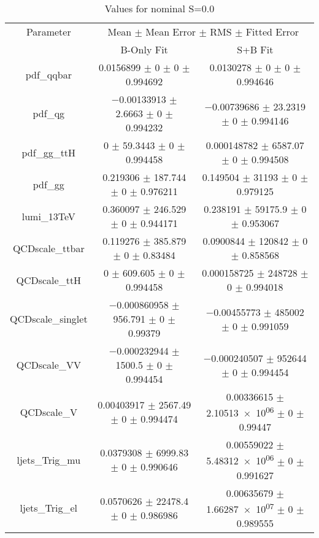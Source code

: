 \begin{table}
\centering
\caption{Values for nominal S=0.0}
\begin{tabular}{ccc}
\toprule
Parameter & \multicolumn{2}{c}{Mean $\pm$ Mean Error $\pm$ RMS $\pm$ Fitted Error}\\
 & B-Only Fit & S+B Fit\\
\midrule
pdf\_qqbar & \num{0.0156899} $\pm$ \num{0} $\pm$ \num{0} $\pm$ \num{0.994692} & \num{0.0130278} $\pm$ \num{0} $\pm$ \num{0} $\pm$ \num{0.994646}\\
pdf\_qg & \num{-0.00133913} $\pm$ \num{2.6663} $\pm$ \num{0} $\pm$ \num{0.994232} & \num{-0.00739686} $\pm$ \num{23.2319} $\pm$ \num{0} $\pm$ \num{0.994146}\\
pdf\_gg\_ttH & \num{0} $\pm$ \num{59.3443} $\pm$ \num{0} $\pm$ \num{0.994458} & \num{0.000148782} $\pm$ \num{6587.07} $\pm$ \num{0} $\pm$ \num{0.994508}\\
pdf\_gg & \num{0.219306} $\pm$ \num{187.744} $\pm$ \num{0} $\pm$ \num{0.976211} & \num{0.149504} $\pm$ \num{31193} $\pm$ \num{0} $\pm$ \num{0.979125}\\
lumi\_13TeV & \num{0.360097} $\pm$ \num{246.529} $\pm$ \num{0} $\pm$ \num{0.944171} & \num{0.238191} $\pm$ \num{59175.9} $\pm$ \num{0} $\pm$ \num{0.953067}\\
QCDscale\_ttbar & \num{0.119276} $\pm$ \num{385.879} $\pm$ \num{0} $\pm$ \num{0.83484} & \num{0.0900844} $\pm$ \num{120842} $\pm$ \num{0} $\pm$ \num{0.858568}\\
QCDscale\_ttH & \num{0} $\pm$ \num{609.605} $\pm$ \num{0} $\pm$ \num{0.994458} & \num{0.000158725} $\pm$ \num{248728} $\pm$ \num{0} $\pm$ \num{0.994018}\\
QCDscale\_singlet & \num{-0.000860958} $\pm$ \num{956.791} $\pm$ \num{0} $\pm$ \num{0.99379} & \num{-0.00455773} $\pm$ \num{485002} $\pm$ \num{0} $\pm$ \num{0.991059}\\
QCDscale\_VV & \num{-0.000232944} $\pm$ \num{1500.5} $\pm$ \num{0} $\pm$ \num{0.994454} & \num{-0.000240507} $\pm$ \num{952644} $\pm$ \num{0} $\pm$ \num{0.994454}\\
QCDscale\_V & \num{0.00403917} $\pm$ \num{2567.49} $\pm$ \num{0} $\pm$ \num{0.994474} & \num{0.00336615} $\pm$ \num{2.10513e+06} $\pm$ \num{0} $\pm$ \num{0.99447}\\
ljets\_Trig\_mu & \num{0.0379308} $\pm$ \num{6999.83} $\pm$ \num{0} $\pm$ \num{0.990646} & \num{0.00559022} $\pm$ \num{5.48312e+06} $\pm$ \num{0} $\pm$ \num{0.991627}\\
ljets\_Trig\_el & \num{0.0570626} $\pm$ \num{22478.4} $\pm$ \num{0} $\pm$ \num{0.986986} & \num{0.00635679} $\pm$ \num{1.66287e+07} $\pm$ \num{0} $\pm$ \num{0.989555}\\

\end{tabular}
\end{table}
